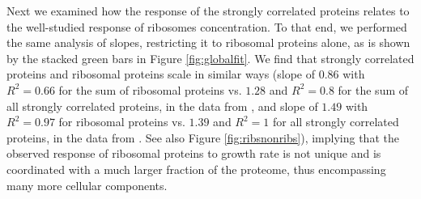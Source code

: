 Next we examined how the response of the strongly correlated proteins relates to the well-studied response of ribosomes concentration.
To that end, we performed the same analysis of slopes, restricting it to ribosomal proteins alone, as is shown by the stacked green bars in Figure \ref{fig:globalfit}.
We find that strongly correlated proteins and ribosomal proteins scale in similar ways (slope of $0.86$ with $R^2=0.66$ for the sum of ribosomal proteins vs. $1.28$ and $R^2=0.8$ for the sum of all strongly correlated proteins, in the data from \cite{Heinemann2015}, and slope of $1.49$ with $R^2=0.97$ for ribosomal proteins vs. $1.39$ and $R^2=1$ for all strongly correlated proteins, in the data from \cite{Valgepea2013}. See also Figure \ref{fig:ribsnonribs}), implying that the observed response of ribosomal proteins to growth rate is not unique and is coordinated with a much larger fraction of the proteome, thus encompassing many more cellular components.